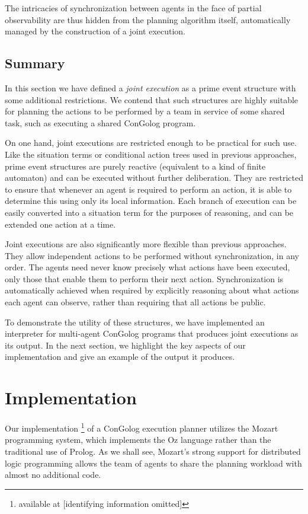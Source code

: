The intricacies of synchronization between agents in the face of partial
observability are thus hidden from the planning algorithm itself,
automatically managed by the construction of a joint execution.


\subsection{Summary}

In this section we have defined a \emph{joint execution} as a prime
event structure with some additional restrictions. We contend that
such structures are highly suitable for planning the actions to be
performed by a team in service of some shared task, such as executing
a shared ConGolog program.

On one hand, joint executions are restricted enough to be practical
for such use. Like the situation terms or conditional action trees
used in previous approaches, prime event structures are purely reactive
(equivalent to a kind of finite automaton) and can be executed without
further deliberation. They are restricted to ensure that whenever
an agent is required to perform an action, it is able to determine
this using only its local information. Each branch of execution can
be easily converted into a situation term for the purposes of reasoning,
and can be extended one action at a time.

Joint executions are also significantly more flexible than previous
approaches. They allow independent actions to be performed without
synchronization, in any order. The agents need never know precisely
what actions have been executed, only those that enable them to perform
their next action. Synchronization is automatically achieved when
required by explicitly reasoning about what actions each agent can
observe, rather than requiring that all actions be public.

To demonstrate the utility of these structures, we have implemented
an interpreter for multi-agent ConGolog programs that produces joint
executions as its output. In the next section, we highlight the key
aspects of our implementation and give an example of the output it
produces.


\section{Implementation}

\label{sec:Implementation}

Our implementation%
\footnote{available at {[}identifying information omitted]%
} of a ConGolog execution planner utilizes the Mozart programming system,
which implements the Oz language \citep{vanroy99mozart} rather than
the traditional use of Prolog. As we shall see, Mozart's strong support
for distributed logic programming allows the team of agents to share
the planning workload with almost no additional code.

